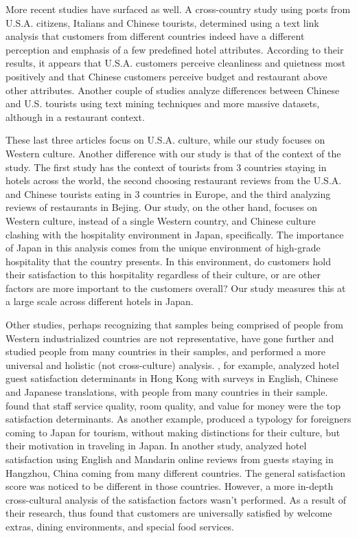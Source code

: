 \documentclass[smallextended,natbib]{svjour3}       %
\begin{document}
More recent studies have surfaced as well. A cross-country study \cite{FRANCESCO201924} using posts from U.S.A. citizens, Italians and Chinese tourists, determined using a text link analysis that customers from different countries indeed have a different perception and emphasis of a few predefined hotel attributes. According to their results, it appears that U.S.A. customers perceive cleanliness and quietness most positively and that Chinese customers perceive budget and restaurant above other attributes. Another couple of studies \cite{JIA2020104071, HUANG2017117} analyze differences between Chinese and U.S. tourists using text mining techniques and more massive datasets, although in a restaurant context. 

These last three articles focus on U.S.A. culture, while our study focuses on Western culture. Another difference with our study is that of the context of the study. The first study \cite{FRANCESCO201924} has the context of tourists from 3 countries staying in hotels across the world, the second choosing restaurant reviews from the U.S.A. and Chinese tourists eating in 3 countries in Europe, and the third analyzing reviews of restaurants in Bejing. Our study, on the other hand, focuses on Western culture, instead of a single Western country, and Chinese culture clashing with the hospitality environment in Japan, specifically. The importance of Japan in this analysis comes from the unique environment of high-grade hospitality that the country presents. In this environment, do customers hold their satisfaction to this hospitality regardless of their culture, or are other factors are more important to the customers overall? Our study measures this at a large scale across different hotels in Japan. 

Other studies, perhaps recognizing that samples being comprised of people from Western industrialized countries are not representative, have gone further and studied people from many countries in their samples, and performed a more universal and holistic (not cross-culture) analysis. \cite{choi2001}, for example, analyzed hotel guest satisfaction determinants in Hong Kong with surveys in English, Chinese and Japanese translations, with people from many countries in their sample. \cite{choi2001} found that staff service quality, room quality, and value for money were the top satisfaction determinants. As another example, \cite{Uzama2012} produced a typology for foreigners coming to Japan for tourism, without making distinctions for their culture, but their motivation in traveling in Japan. In another study, \cite{zhou2014} analyzed hotel satisfaction using English and Mandarin online reviews from guests staying in Hangzhou, China coming from many different countries. The general satisfaction score was noticed to be different in those countries. However, a more in-depth cross-cultural analysis of the satisfaction factors wasn't performed. As a result of their research, \cite{zhou2014} thus found that customers are universally satisfied by welcome extras, dining environments, and special food services. 
\end{document}
